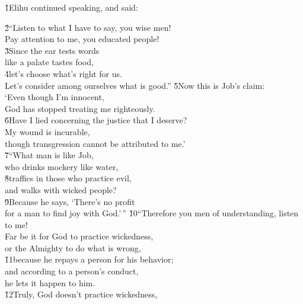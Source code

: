 \v{1}Elihu continued speaking, and said:

\begin{poetry}
\poeml \v{2}``Listen to what I have to say, you wise men! \\
\poemll    Pay attention to me, you educated people! \\
\poeml \v{3}Since the ear tests words \\
\poemll    like a palate tastes food, \\
\poeml \v{4}let's choose what's right for us. \\
\poemll    Let's consider among ourselves what is good.''
\poeml \v{5}Now this is Job's claim: \\
\poeml `Even though I'm innocent, \\
\poemll    God has stopped treating me righteously. \\
\poeml \v{6}Have I lied concerning the justice that I deserve? \\
\poemll    My wound is incurable, \\
\poemlll       though transgression cannot be attributed to me.' \\
\poeml \v{7}``What man is like Job, \\
\poemll    who drinks mockery like water, \\
\poeml \v{8}traffics in those who practice evil, \\
\poemll    and walks with wicked people? \\
\poeml \v{9}Because he says, `There's no profit \\
\poemll    for a man to find joy with God.'\,''
\poeml \v{10}``Therefore you men of understanding, listen to me! \\
\poemll    Far be it for God to practice wickedness, \\
\poemlll       or the Almighty to do what is wrong, \\
\poeml \v{11}because he repays a person for his behavior; \\
\poemll    and according to a person's conduct, \\
\poemlll       he lets it happen to him. \\
\poeml \v{12}Truly, God doesn't practice wickedness, \\

\end{poetry}
